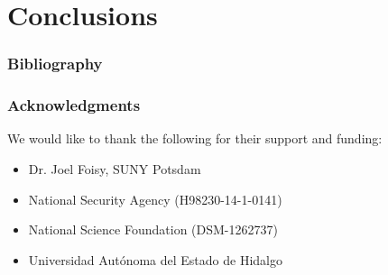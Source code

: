 
\section{Conclusions}



\begin{frame}[allowframebreaks]
  \frametitle{Bibliography}
{\tiny
  
  
}
\end{frame}

\begin{frame}
  \frametitle{Acknowledgments}
  
  We would like to thank the following for their support and funding: 
  
 \begin{itemize}
 \item Dr. Joel Foisy, SUNY Potsdam
 \item National Security Agency (H98230-14-1-0141)
 \item National Science Foundation (DSM-1262737)
 \item Universidad Aut\'onoma del Estado de Hidalgo
 \end{itemize}
\end{frame}


